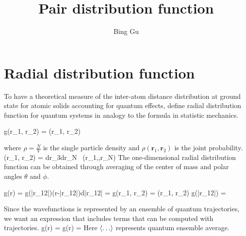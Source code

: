 \documentclass[11pt]{revtex4}
\begin{document}
\title{Pair distribution function}
\author{Bing Gu}

\begin{abstract}

\end{abstract}

\maketitle
\section{Radial distribution function}
To have a theoretical measure of the inter-atom distance distribution at ground state for atomic solids accounting for quantum effects, define radial distribution function for quantum systems in analogy to the formula in statistic mechanics. 
 
\be g(\bm r_1, \bm r_2) =  \rho(\bm r_1, \bm r_2) \ee
 
where $\rho = \frac{N}{V}$ is the single particle density and $\rho(\bm r_1, \bm r_2)$ is the joint probability. 
\be \rho(\bm r_1, \bm r_2) = \int d\bm r_3\cdots d\bm r_N~ \rho(\bm r_1,\cdots,\bm r_N) \ee
The one-dimensional radial distribution function can be obtained through averaging of the center of mass and polar angles $\theta$ and $\phi$.  

\be g(r) = \int g(|r_{12}|)\delta(r-|r_{12}|)d|r_{12}| = g(\bm r_1, \bm r_2) =  \rho(\bm r_1, \bm r_2) \ee 
\be g(|r_{12}|) =  \ee 

Since the wavefunctions is represented by an ensemble of quantum trajectories, we want an expression that includes terms that can be computed with trajectories.  
\be g(r)  = \left \bra {}  \right \ket \ee 
\be g(r) =  \left \bra {}  \right \ket \ee
Here $\bra \dots \ket$ represents quantum ensemble average.  
\end{document}
